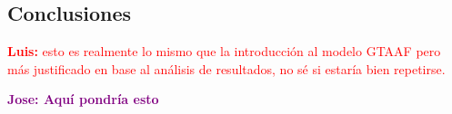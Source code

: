 \documentclass{uathesis-es}
\begin{document}
{%


\subsection*{Conclusiones}

\textcolor{red}{\textbf{Luis: } esto es realmente lo mismo que la introducción al modelo GTAAF pero más justificado en base al análisis de resultados, no sé si estaría bien repetirse.}

\textcolor{purple}{\textbf{Jose: Aquí pondría esto}}

}
\end{document}
